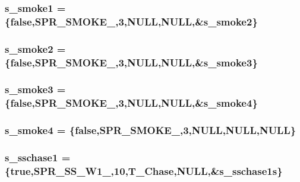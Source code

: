 \label{WL__ACT2_8C_a96c8ad498d80bfcb7bb739872d571ac2}
\hypertarget{WL__ACT2_8C_a9735e94026b7e564dd85a52ce7ac19ae}{
\subsubsection[{s\_\-smoke1}]{ {\bf s\_\-smoke1} = \{false,SPR\_\-SMOKE\_,3,NULL,NULL,\&{\bf s\_\-smoke2}\}}}
\label{WL__ACT2_8C_a9735e94026b7e564dd85a52ce7ac19ae}
\hypertarget{WL__ACT2_8C_a22fa7750c99c09569a35abfc704e4570}{
\subsubsection[{s\_\-smoke2}]{ {\bf s\_\-smoke2} = \{false,SPR\_\-SMOKE\_,3,NULL,NULL,\&{\bf s\_\-smoke3}\}}}
\label{WL__ACT2_8C_a22fa7750c99c09569a35abfc704e4570}
\hypertarget{WL__ACT2_8C_a4872fe791b812aa34d2b5d249ada1e48}{
\subsubsection[{s\_\-smoke3}]{ {\bf s\_\-smoke3} = \{false,SPR\_\-SMOKE\_,3,NULL,NULL,\&{\bf s\_\-smoke4}\}}}
\label{WL__ACT2_8C_a4872fe791b812aa34d2b5d249ada1e48}
\hypertarget{WL__ACT2_8C_a86fab02d9f5f61e77001e7532ae09e94}{
\subsubsection[{s\_\-smoke4}]{ {\bf s\_\-smoke4} = \{false,SPR\_\-SMOKE\_,3,NULL,NULL,NULL\}}}
\label{WL__ACT2_8C_a86fab02d9f5f61e77001e7532ae09e94}
\hypertarget{WL__ACT2_8C_ae0f8e756abc0877ae24d5fd8e3b88bea}{
\subsubsection[{s\_\-sschase1}]{ {\bf s\_\-sschase1} = \{true,SPR\_\-SS\_\-W1\_,10,T\_\-Chase,NULL,\&{\bf s\_\-sschase1s}\}}}
